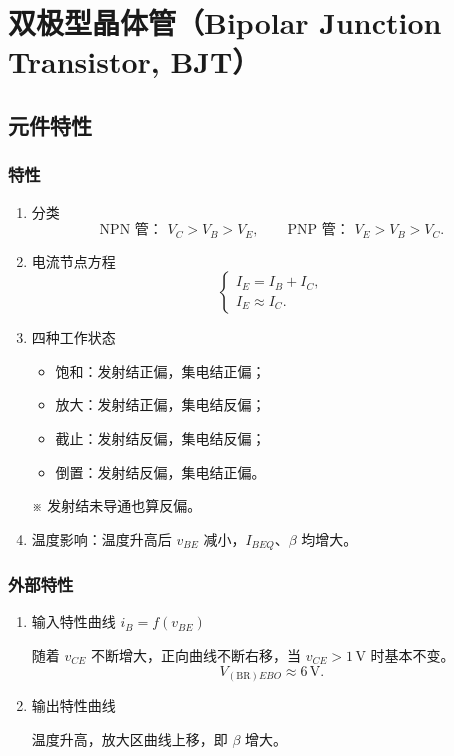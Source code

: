 \documentclass[UTF8,fontset=fandol,zihao=5]{ctexart}
\begin{document}
\section{双极型晶体管（Bipolar Junction Transistor, BJT）}

\subsection{元件特性}

\subsubsection{特性}

\begin{enumerate}
  \item 分类
  \[
    \text{NPN 管： }V_C>V_B>V_E,
    \qquad
    \text{PNP 管： }V_E>V_B>V_C.
  \]

  \item 电流节点方程
  \[
    \begin{cases}
      I_E=I_B+I_C,\\
      I_E\approx I_C.
    \end{cases}
  \]

  \item 四种工作状态
  \begin{itemize}
    \item 饱和：发射结正偏，集电结正偏；
    \item 放大：发射结正偏，集电结反偏；
    \item 截止：发射结反偏，集电结反偏；
    \item 倒置：发射结反偏，集电结正偏。
  \end{itemize}
  ※ 发射结未导通也算反偏。

  \item 温度影响：温度升高后 $v_{BE}$ 减小，$I_{BEQ}$、$\beta$ 均增大。
\end{enumerate}

\subsubsection{外部特性}

\begin{enumerate}
  \item 输入特性曲线 $i_B=f(v_{BE})$

  随着 $v_{CE}$ 不断增大，正向曲线不断右移，当 $v_{CE}>1\,\mathrm V$ 时基本不变。
  \[
    V_{(\mathrm{BR})EBO}\approx6\,\mathrm V.
  \]

  \item 输出特性曲线

  温度升高，放大区曲线上移，即 $\beta$ 增大。
\end{enumerate}
\end{document}
